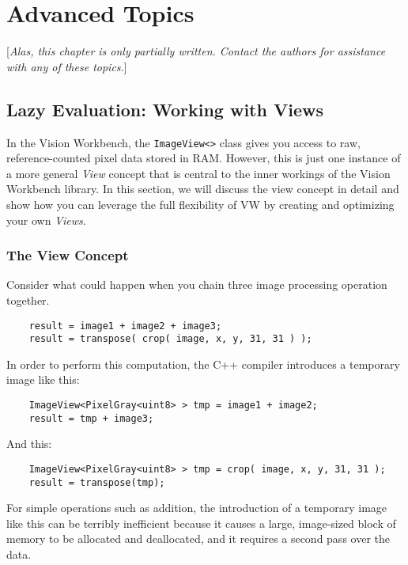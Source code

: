 \chapter{Advanced Topics}\label{ch:advanced-topics}

[{\em Alas, this chapter is only partially written.  Contact the authors for
assistance with any of these topics.}]
$$
$$

\section{Lazy Evaluation: Working with Views}\label{sec:views}

In the Vision Workbench, the \verb#ImageView<># class gives you access
to raw, reference-counted pixel data stored in RAM.  However, this is
just one instance of a more general {\em View} concept that is central
to the inner workings of the Vision Workbench library.  In this
section, we will discuss the view concept in detail and show how you
can leverage the full flexibility of VW by creating and optimizing
your own {\em Views}.

\subsection {The View Concept}

Consider what could happen when you chain three image processing
operation together.

\begin{verbatim}
    result = image1 + image2 + image3;
    result = transpose( crop( image, x, y, 31, 31 ) );
\end{verbatim}

In order to perform this computation, the C++ compiler introduces a
temporary image like this:

\begin{verbatim}
    ImageView<PixelGray<uint8> > tmp = image1 + image2;
    result = tmp + image3;
\end{verbatim}

And this:

\begin{verbatim}
    ImageView<PixelGray<uint8> > tmp = crop( image, x, y, 31, 31 );
    result = transpose(tmp);
\end{verbatim}

For simple operations such as addition, the introduction of a
temporary image like this can be terribly inefficient because it
causes a large, image-sized block of memory to be allocated and
deallocated, and it requires a second pass over the data.  

